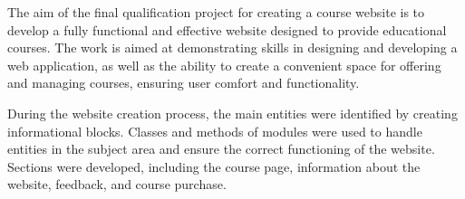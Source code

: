 The aim of the final qualification project for creating a course website is to develop a fully functional and effective website designed to provide educational courses. The work is aimed at demonstrating skills in designing and developing a web application, as well as the ability to create a convenient space for offering and managing courses, ensuring user comfort and functionality.

During the website creation process, the main entities were identified by creating informational blocks. Classes and methods of modules were used to handle entities in the subject area and ensure the correct functioning of the website. Sections were developed, including the course page, information about the website, feedback, and course purchase.
